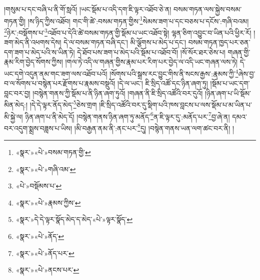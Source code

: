 །གསུམ་པ་དང་བཞི་པ་ནི་གོ་སླའོ། །ཡང་སྡོམ་པ་འདི་དག་ཇི་ལྟར་འཐོབ་ཅེ་ན། བསམ་གཏན་ལས་སྐྱེས་བསམ་གཏན་གྱི། །ས་ཉིད་ཀྱིས་འཐོབ། གང་གི་ཚེ་:བསམ་གཏན་གྱིས་\footnote{«སྣར་»«པེ་»བསམ་གཏན་གྱི་}སེམས་ཟག་པ་དང་བཅས་པ་དངོས་:གཞི་བའམ། \footnote{«སྣར་»«པེ་»གཞི་འམ་}ཉེར་:བསྡོགས་པ་\footnote{«པེ་»བསྡོམས་པ་}འཐོབ་པ་དེའི་ཚེ་བསམ་གཏན་གྱི་སྡོམ་པ་ཡང་འཐོབ་སྟེ། ལྷན་ཅིག་འབྱུང་བ་ཡིན་པའི་ཕྱིར་རོ། །ཟག་མེད་ནི་འཕགས་དེས། དེ་ལ་བསམ་གཏན་བཞི་དང་། མི་ལྕོགས་པ་མེད་པ་དང་། བསམ་གཏན་ཁྱད་པར་ཅན་དག་ཟག་པ་མེད་པའི་ས་ཡིན་ཏེ། དེ་ཐོབ་པས་ཟག་པ་མེད་པའི་སྡོམ་པ་འཐོབ་བོ། །སོ་སོར་ཐར་ཅེས་པ། གཞན་གྱི་རྣམ་རིག་བྱེད་སོགས་ཀྱིས། །གལ་ཏེ་འདི་ལ་གཞན་གྱིས་རྣམ་པར་རིག་པར་བྱེད་ལ་འདི་ཡང་གཞན་ལས་ཏེ། དེ་ཡང་དགེ་འདུན་ནམ་གང་ཟག་ལས་འཐོབ་པའོ། །སོགས་པའི་སྒྲས་རང་བྱུང་གིས་ནི་སངས་རྒྱས་:རྣམས་ཀྱི་\footnote{«སྣར་»«པེ་»རྣམས་ཀྱིས་}ཞེས་བྱ་བ་ལ་སོགས་པ་བསྙེན་པར་རྫོགས་པ་རྣམས་བསྡུའོ། །དེ་ལ་ཡང་། ཇི་སྲིད་འཚོ་དང་ཉིན་ཞག་ཏུ། །སྡོམ་པ་ཡང་དག་བླང་བར་བྱ། །བསྙེན་གནས་ཀྱི་སྡོམ་པ་ནི་ཉིན་ཞག་ཏུའོ། །གཞན་ནི་ཇི་སྲིད་འཚོའི་བར་དུའོ། །ཉིན་ཞག་པ་ཡི་སྡོམ་མིན་མེད:། །དེ་དེ་ལྟར་ནོད་མེད་\footnote{«སྣར་»དེ་དེ་ལྟར་སྣོད་མེད་ད་མེད་«པེ་»ལྟར་སྣོད་}ཅེས་གྲག །ཇི་སྲིད་འཚོའི་བར་དུ་སྡིག་པའི་ཁས་བླངས་པ་ལས་སྡོམ་པ་མ་ཡིན་པ་མི་སྐྱེ་ལ། ཉིན་ཞག་པ་ནི་མེད་དོ། །བསྙེན་གནས་ཉིན་ཞག་ཏུ་མནོད་\footnote{«སྣར་»«པེ་»ནོད་}ན་ཇི་ལྟར་དུ་:མནོད་པར་\footnote{«སྣར་»«པེ་»ནོད་པར་}བྱ་ཞེ་ན། དམའ་བར་འདུག་སྨྲས་བཟླས་པ་ཡིས། །མི་བརྒྱན་ནམ་ནི་:ནང་པར་\footnote{«སྣར་»«པེ་»ནངས་པར་}དུ། །བསྙེན་གནས་ཡན་ལག་ཚང་བར་ནི། །
